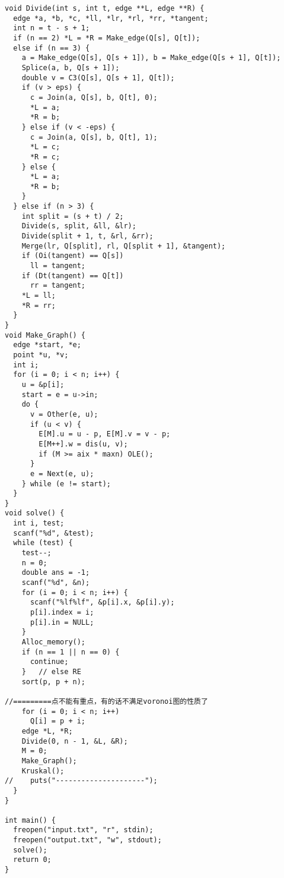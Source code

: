 \begin{lstlisting}
void Divide(int s, int t, edge **L, edge **R) {
  edge *a, *b, *c, *ll, *lr, *rl, *rr, *tangent;
  int n = t - s + 1;
  if (n == 2) *L = *R = Make_edge(Q[s], Q[t]);
  else if (n == 3) {
    a = Make_edge(Q[s], Q[s + 1]), b = Make_edge(Q[s + 1], Q[t]);
    Splice(a, b, Q[s + 1]);
    double v = C3(Q[s], Q[s + 1], Q[t]);
    if (v > eps) {
      c = Join(a, Q[s], b, Q[t], 0);
      *L = a;
      *R = b;
    } else if (v < -eps) {
      c = Join(a, Q[s], b, Q[t], 1);
      *L = c;
      *R = c;
    } else {
      *L = a;
      *R = b;
    }
  } else if (n > 3) {
    int split = (s + t) / 2;
    Divide(s, split, &ll, &lr);
    Divide(split + 1, t, &rl, &rr);
    Merge(lr, Q[split], rl, Q[split + 1], &tangent);
    if (Oi(tangent) == Q[s])
      ll = tangent;
    if (Dt(tangent) == Q[t])
      rr = tangent;
    *L = ll;
    *R = rr;
  }
}
void Make_Graph() {
  edge *start, *e;
  point *u, *v;
  int i;
  for (i = 0; i < n; i++) {
    u = &p[i];
    start = e = u->in;
    do {
      v = Other(e, u);
      if (u < v) {
        E[M].u = u - p, E[M].v = v - p;
        E[M++].w = dis(u, v);
        if (M >= aix * maxn) OLE();
      }
      e = Next(e, u);
    } while (e != start);
  }
}
void solve() {
  int i, test;
  scanf("%d", &test);
  while (test) {
    test--;
    n = 0;
    double ans = -1;
    scanf("%d", &n);
    for (i = 0; i < n; i++) {
      scanf("%lf%lf", &p[i].x, &p[i].y);
      p[i].index = i;
      p[i].in = NULL;
    }
    Alloc_memory();
    if (n == 1 || n == 0) {
      continue;
    }   // else RE
    sort(p, p + n);

//=========点不能有重点，有的话不满足voronoi图的性质了 
    for (i = 0; i < n; i++)
      Q[i] = p + i;
    edge *L, *R;
    Divide(0, n - 1, &L, &R);
    M = 0;
    Make_Graph();
    Kruskal();
//    puts("---------------------");
  }
}

int main() {
  freopen("input.txt", "r", stdin);
  freopen("output.txt", "w", stdout);
  solve();
  return 0;
}


\end{lstlisting}